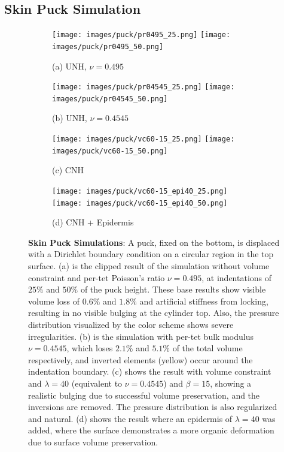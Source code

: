 \subsection{Skin Puck Simulation}

\begin{figure}
	\centering
	\begin{subfigure}{.24\linewidth}
		\centering
		\texttt{[image: images/puck/pr0495\_25.png]}
		\texttt{[image: images/puck/pr0495\_50.png]}
		\caption*{(a) UNH, $\nu = 0.495$}
		\label{sfig:puck-pr0495}
	\end{subfigure}
	\begin{subfigure}{.24\linewidth}
		\centering
		\texttt{[image: images/puck/pr04545\_25.png]}
		\texttt{[image: images/puck/pr04545\_50.png]}
		\caption*{(b) UNH, $\nu = 0.4545$}
		\label{sfig:puck-pr04545}
	\end{subfigure}%
	\begin{subfigure}{.24\linewidth}
		\centering
		\texttt{[image: images/puck/vc60-15\_25.png]}
		\texttt{[image: images/puck/vc60-15\_50.png]}
		\caption*{(c) CNH}
		\label{sfig:puck-vc}
	\end{subfigure}%
	\begin{subfigure}{.24\linewidth}
		\centering
		\texttt{[image: images/puck/vc60-15\_epi40\_25.png]}
		\texttt{[image: images/puck/vc60-15\_epi40\_50.png]}
		\caption*{(d) CNH + Epidermis}
		\label{sfig:puck-vc-epi}
	\end{subfigure}%
	\caption{\textbf{Skin Puck Simulations}: A puck, fixed on the bottom, is displaced with a Dirichlet boundary condition on a circular region in the top surface. (a) is the clipped result of the simulation without volume constraint and per-tet Poisson's ratio $\nu = 0.495$, at indentations of $25\%$ and $50\%$ of the puck height. These base results show visible volume loss of $0.6\%$ and $1.8\%$ and artificial stiffness from locking, resulting in no visible bulging at the cylinder top. Also, the pressure distribution visualized by the color scheme shows severe irregularities. (b) is the simulation with per-tet bulk modulus $\nu = 0.4545$, which loses $2.1\%$ and $5.1\%$ of the total volume respectively, and inverted elements (yellow) occur around the indentation boundary. (c) shows the result with volume constraint and $\lambda = 40$ (equivalent to $\nu = 0.4545$) and $\beta = 15$, showing a realistic bulging due to successful volume preservation, and the inversions are removed. The pressure distribution is also regularized and natural. (d) shows the result where an epidermis of $\lambda = 40$ was added, where the surface demonstrates a more organic deformation due to surface volume preservation. }
	\label{fig:pucks}
\end{figure} 

